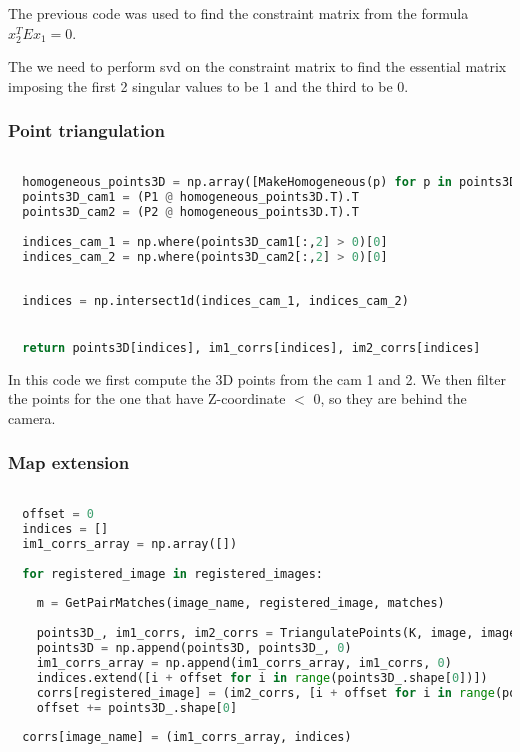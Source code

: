 \documentclass{ETHExercise}
\begin{document}
The previous code was used to find the constraint matrix from 
the formula $x_2^T E x_1 = 0$.

The we need to perform svd on the constraint matrix to find
the essential matrix imposing the first 2 singular values 
to be 1 and the third to be 0.

\subsubsection{Point triangulation}

\begin{lstlisting}[language=Python, caption=point triangulation]

  homogeneous_points3D = np.array([MakeHomogeneous(p) for p in points3D])
  points3D_cam1 = (P1 @ homogeneous_points3D.T).T
  points3D_cam2 = (P2 @ homogeneous_points3D.T).T
  
  indices_cam_1 = np.where(points3D_cam1[:,2] > 0)[0]
  indices_cam_2 = np.where(points3D_cam2[:,2] > 0)[0]
  
  
  indices = np.intersect1d(indices_cam_1, indices_cam_2)
  

  return points3D[indices], im1_corrs[indices], im2_corrs[indices]

\end{lstlisting}

In this code we first compute the 3D points from the cam 1 and 2. We then filter
the points for the one that have Z-coordinate $<$ 0, so they are behind 
the camera.

\subsubsection{Map extension}

\begin{lstlisting}[language=Python, caption=Trinagulate images]

  offset = 0
  indices = []
  im1_corrs_array = np.array([])
  
  for registered_image in registered_images:
    
    m = GetPairMatches(image_name, registered_image, matches)
    
    points3D_, im1_corrs, im2_corrs = TriangulatePoints(K, image, images[registered_image], m)
    points3D = np.append(points3D, points3D_, 0)
    im1_corrs_array = np.append(im1_corrs_array, im1_corrs, 0)
    indices.extend([i + offset for i in range(points3D_.shape[0])])
    corrs[registered_image] = (im2_corrs, [i + offset for i in range(points3D_.shape[0])])
    offset += points3D_.shape[0]
    
  corrs[image_name] = (im1_corrs_array, indices)
\end{lstlisting}
\end{document}
